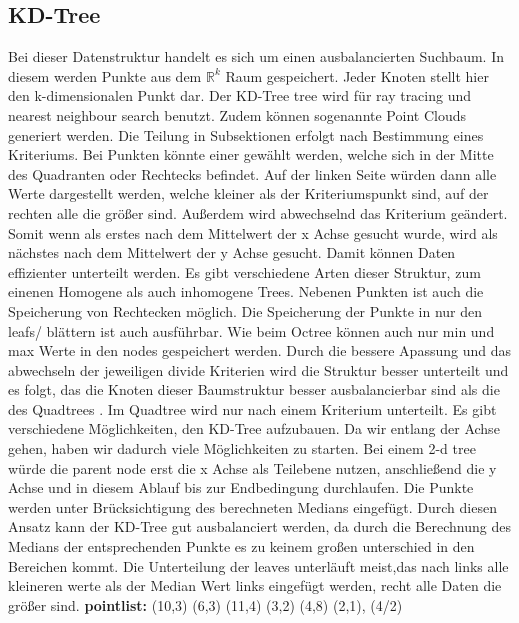 \documentclass[11pt]{article}
\newcommand{\qt}{Quadtree }
\newcommand{\oc}{Octree }
\newcommand{\kd}{KD-Tree }
\newcommand{\qts}{Quadtrees }
\newcommand{\fett}[1]{{\bf #1}}
\begin{document}
\subsection{\fett{\kd}}
Bei dieser Datenstruktur handelt es sich um einen ausbalancierten Suchbaum. In diesem werden Punkte aus dem $\mathbb{R} ^k$ Raum gespeichert. Jeder Knoten stellt hier den k-dimensionalen Punkt dar. 
Der \kd tree wird für ray tracing und nearest neighbour search benutzt. Zudem können sogenannte Point Clouds generiert werden. 
Die Teilung in Subsektionen erfolgt nach Bestimmung eines Kriteriums. Bei Punkten könnte einer gewählt werden, welche sich in der Mitte des Quadranten oder Rechtecks befindet. Auf der linken Seite würden dann alle Werte dargestellt werden, welche kleiner als der Kriteriumspunkt sind, auf der rechten alle die größer sind. Außerdem wird abwechselnd das Kriterium geändert. Somit wenn als erstes nach dem Mittelwert der x Achse gesucht wurde, wird als nächstes nach dem Mittelwert der y Achse gesucht. Damit können Daten effizienter unterteilt werden.  
\newline
Es gibt verschiedene Arten dieser Struktur, zum einenen Homogene als auch inhomogene Trees. Nebenen Punkten ist auch die Speicherung von Rechtecken möglich. Die Speicherung der Punkte in nur den leafs/ blättern ist auch ausführbar. Wie beim \oc  können auch nur min und max Werte in den nodes gespeichert werden.
Durch die bessere Apassung und das abwechseln der jeweiligen divide Kriterien wird die Struktur besser unterteilt und es folgt, das die Knoten dieser Baumstruktur besser ausbalancierbar sind als die des \qts. Im \qt wird nur nach einem Kriterium unterteilt. 
Es gibt verschiedene Möglichkeiten, den \kd aufzubauen. Da wir entlang der Achse gehen, haben wir dadurch viele Möglichkeiten zu starten. 
Bei einem 2-d tree würde die parent node erst die x Achse als Teilebene nutzen, anschließend die y Achse und in diesem Ablauf bis zur Endbedingung durchlaufen. 
Die Punkte werden unter Brücksichtigung des berechneten Medians eingefügt.  Durch diesen Ansatz kann der \kd gut ausbalanciert werden, da durch die Berechnung des Medians der entsprechenden Punkte es zu keinem großen unterschied in den Bereichen kommt. 
Die Unterteilung der leaves unterläuft meist,das nach links alle kleineren werte als der Median Wert links eingefügt werden, recht alle Daten die größer sind.  
\newline    
\fett{pointlist:} { (10,3) (6,3) (11,4) (3,2) (4,8) (2,1), (4/2) } 
\newline
\end{document}
